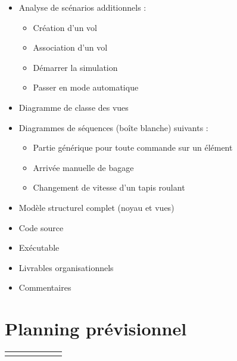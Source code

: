 \begin{itemize}
	\item Analyse de scénarios additionnels \Proto{} :
	\begin{itemize}
		\item Création d'un vol
		\item Association d'un vol
		\item Démarrer la simulation
		\item Passer en mode automatique
	\end{itemize}
	\item Diagramme de classe des vues
	\item Diagrammes de séquences (boîte blanche) suivants \Proto{} :
	\begin{itemize}
		\item Partie générique pour toute commande sur un élément
		\item Arrivée manuelle de bagage
		\item Changement de vitesse d'un tapis roulant
	\end{itemize}
	\item Modèle structurel complet (noyau et vues) \Proto
	\item Code source \Proto
	\item Exécutable \Proto
\end{itemize}

\begin{itemize}
	\item Livrables organisationnels
	\item Commentaires
\end{itemize}


\section{Planning prévisionnel}

\begin{tabular}{|c|c|c|c|c|c|}
& & & & & 
\end{tabular}

